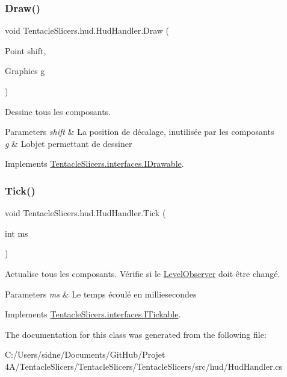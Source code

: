 \subsubsection{\texorpdfstring{Draw()}{Draw()}}
{\footnotesize\ttfamily void Tentacle\+Slicers.\+hud.\+Hud\+Handler.\+Draw (\begin{DoxyParamCaption}\item[{Point}]{shift,  }\item[{Graphics}]{g }\end{DoxyParamCaption})}



Dessine tous les composants. 


\begin{DoxyParams}{Parameters}
{\em shift} & La position de décalage, inutilisée par les composants \\
\hline
{\em g} & L\textquotesingle{}objet permettant de dessiner \\
\hline
\end{DoxyParams}


Implements \hyperlink{interface_tentacle_slicers_1_1interfaces_1_1_i_drawable}{Tentacle\+Slicers.\+interfaces.\+I\+Drawable}.

\mbox{\label{class_tentacle_slicers_1_1hud_1_1_hud_handler_a3786a79f72b2f65630ca61363dcd3246}} 
\subsubsection{\texorpdfstring{Tick()}{Tick()}}
{\footnotesize\ttfamily void Tentacle\+Slicers.\+hud.\+Hud\+Handler.\+Tick (\begin{DoxyParamCaption}\item[{int}]{ms }\end{DoxyParamCaption})}



Actualise tous les composants. Vérifie si le \hyperlink{class_tentacle_slicers_1_1hud_1_1_level_observer}{Level\+Observer} doit être changé. 


\begin{DoxyParams}{Parameters}
{\em ms} & Le temps écoulé en milliesecondes \\
\hline
\end{DoxyParams}


Implements \hyperlink{interface_tentacle_slicers_1_1interfaces_1_1_i_tickable}{Tentacle\+Slicers.\+interfaces.\+I\+Tickable}.



The documentation for this class was generated from the following file\+:\begin{DoxyCompactItemize}
\item 
C\+:/\+Users/sidne/\+Documents/\+Git\+Hub/\+Projet 4\+A/\+Tentacle\+Slicers/\+Tentacle\+Slicers/\+Tentacle\+Slicers/src/hud/Hud\+Handler.\+cs\end{DoxyCompactItemize}
